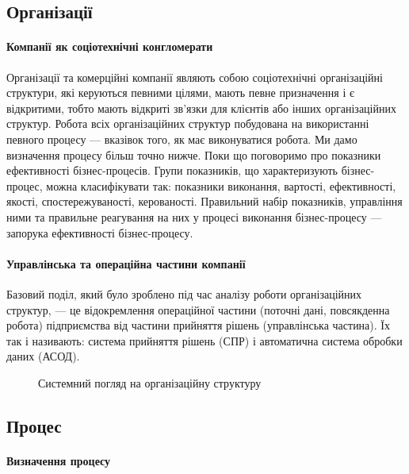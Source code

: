 \documentclass{memoir}
\begin{document}
\subsection{Організації}

\paragraph{Компанії як соціотехнічні конгломерати}

Організації та комерційні компанії являють собою соціотехнічні організаційні структури, які керуються певними цілями, мають певне призначення і є відкритими, тобто мають відкриті зв’язки для клієнтів або інших організаційних структур. Робота всіх організаційних структур побудована на використанні певного процесу — вказівок того, як має виконуватися робота. Ми дамо визначення процесу більш точно нижче. Поки що поговоримо про показники ефективності бізнес-процесів. Групи показників, що характеризують бізнес-процес, можна класифікувати так: показники виконання, вартості, ефективності, якості, спостережуваності, керованості. Правильний набір показників, управління ними та правильне реагування на них у процесі виконання бізнес-процесу — запорука ефективності бізнес-процесу.

\paragraph{Управлінська та операційна частини компанії}

Базовий поділ, який було зроблено під час аналізу роботи організаційних структур, — це відокремлення операційної частини (поточні дані, повсякденна робота) підприємства від частини прийняття рішень (управлінська частина). Їх так і називають: система прийняття рішень (СПР) і автоматична система обробки даних (АСОД).

\begin{figure}[h]
    \centering
    \caption{Системний погляд на організаційну структуру}
    \label{fig:org_structure}
\end{figure}

\subsection{Процес}

\paragraph{Визначення процесу}
\end{document}
